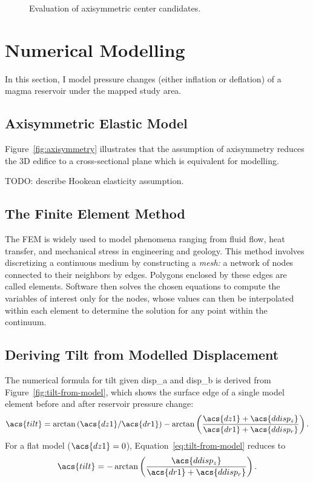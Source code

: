 \begin{figure}
    \caption[]{Evaluation of axisymmetric center candidates.}%
    \label{fig:centers-eval-model}
\end{figure}

\section{Numerical Modelling}\label{sec:modelling}

In this section, I model pressure changes (either inflation or deflation) of a magma reservoir under the mapped study area.

\subsection{Axisymmetric Elastic Model}

Figure~\ref{fig:axisymmetry} illustrates that the assumption of axisymmetry reduces the 3D edifice to a cross-sectional plane which is equivalent for modelling.

TODO: describe Hookean elasticity assumption.

\subsection{The Finite Element Method}

The \ac{FEM} is widely used to model phenomena ranging from fluid flow, heat transfer, and mechanical stress in engineering and geology. This method involves discretizing a continuous medium by constructing a \emph{mesh:} a network of nodes connected to their neighbors by edges. Polygons enclosed by these edges are called elements. Software then solves the chosen equations to compute the variables of interest only for the nodes, whose values can then be interpolated within each element to determine the solution for any point within the continuum.

\subsection{Deriving Tilt from Modelled Displacement}

The numerical formula for \acf{tilt} given \acs{disp_a} and \acs{disp_b} is derived from Figure~\ref{fig:tilt-from-model}, which shows the surface edge of a single model element before and after reservoir pressure change:
\begin{equation}
    \acs{tilt} = \arctan\left({\acs{dz1}}/{\acs{dr1}}\right) - \arctan\left(\dfrac{\acs{dz1}+\acs{ddisp_z}}{\acs{dr1}+\acs{ddisp_r}}\right).\label{eq:tilt-from-model}
\end{equation}
For a flat model ($\acs{dz1} = 0$), Equation~\eqref{eq:tilt-from-model} reduces to
\begin{equation}
    \acs{tilt} = 
    -\arctan\left(\dfrac{\acs{ddisp_z}}{\acs{dr1}+\acs{ddisp_r}}\right).\label{eq:tilt-from-flat-model}
\end{equation}

